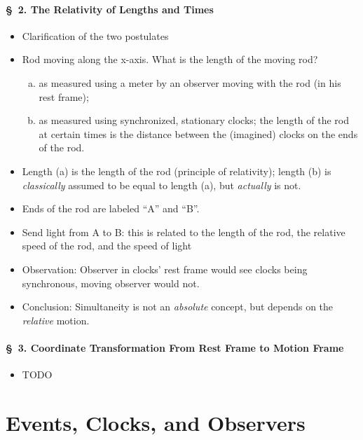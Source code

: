 \documentclass[pagesize,headsepline,10pt,parskip=half]{scrreprt}
\begin{document}
          \paragraph{§ 2. The Relativity of Lengths and Times}
            \begin{itemize}
              \item Clarification of the two postulates
              \item Rod moving along the x-axis.  What is the length of the moving rod?
                \begin{enumerate}[a)]
                  \item as measured using a meter by an observer moving with the rod (in his rest frame);
                  \item as measured using synchronized, stationary clocks;
                    the length of the rod at certain times is the distance
                    between the (imagined) clocks on the ends of the rod.
                \end{enumerate}
              \item Length (a) is the length of the rod (principle of relativity);
                length (b) is \emph{classically} assumed to be equal to length (a), but \emph{actually} is not.
              \item Ends of the rod are labeled “A” and “B”.
              \item Send light from A to B\@: this is related to the length of the rod, the relative speed of the rod, and the speed of light
              \item Observation: Observer in clocks’ rest frame would see clocks being synchronous, moving observer would not.
              \item Conclusion: Simultaneity is not an \emph{absolute} concept, but depends on the \emph{relative} motion.
            \end{itemize}

            \paragraph{§ 3. Coordinate Transformation From Rest Frame to Motion Frame}
              \begin{itemize}
                \item TODO
              \end{itemize}

    \clearpage
    \section{Events, Clocks, and Observers}
\end{document}
